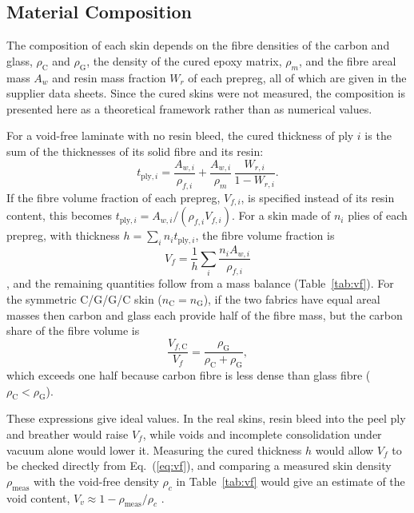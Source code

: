 \documentclass[11pt,a4paper]{article}
\newenvironment{addedblock}{\color{addgreen}}{}
\newenvironment{addedblock}{}{}
\begin{document}
\begin{addedblock}
\subsection{Material Composition}
\label{sec:composition}

The composition of each skin depends on the fibre densities of the
carbon and glass, $\rho_\mathrm{C}$ and $\rho_\mathrm{G}$, the density
of the cured epoxy matrix, $\rho_m$, and the fibre areal mass $A_w$ and
resin mass fraction $W_r$ of each prepreg, all of which are given in
the supplier data sheets. Since the cured skins were not measured, the
composition is presented here as a theoretical framework rather than
as numerical values.

For a void-free laminate with no resin bleed, the cured thickness of
ply $i$ is the sum of the thicknesses of its solid fibre and its resin:
\begin{equation}
    t_{\mathrm{ply},i} = \frac{A_{w,i}}{\rho_{f,i}}
    + \frac{A_{w,i}}{\rho_m}\,\frac{W_{r,i}}{1-W_{r,i}}.
    \label{eq:cpt}
\end{equation}
If the fibre volume fraction of each prepreg, $V_{f,i}$, is specified
instead of its resin content, this becomes
$t_{\mathrm{ply},i} = A_{w,i}/(\rho_{f,i}V_{f,i})$. For a skin made of
$n_i$ plies of each prepreg, with thickness
$h = \sum_i n_i t_{\mathrm{ply},i}$, the fibre volume fraction is
\begin{equation}
    V_f = \frac{1}{h}\sum_i \frac{n_i A_{w,i}}{\rho_{f,i}}
    \label{eq:vf}
\end{equation}
\citep{astm_d3171}, and the remaining quantities follow from a mass
balance (Table~\ref{tab:vf}). For the symmetric C/G/G/C skin
($n_\mathrm{C} = n_\mathrm{G}$), if the two fabrics have equal areal
masses then carbon and glass each provide half of the fibre mass, but
the carbon share of the fibre volume is
\begin{equation}
    \frac{V_{f,\mathrm{C}}}{V_f} = \frac{\rho_\mathrm{G}}{\rho_\mathrm{C}+\rho_\mathrm{G}},
    \label{eq:cshare}
\end{equation}
which exceeds one half because carbon fibre is less dense than glass
fibre ($\rho_\mathrm{C} < \rho_\mathrm{G}$).

These expressions give ideal values. In the real skins, resin bleed
into the peel ply and breather would raise $V_f$, while voids and
incomplete consolidation under vacuum alone would lower it. Measuring
the cured thickness $h$ would allow $V_f$ to be checked directly from
Eq.~(\ref{eq:vf}), and comparing a measured skin density
$\rho_\mathrm{meas}$ with the void-free density $\rho_c$ in
Table~\ref{tab:vf} would give an estimate of the void content,
$V_v \approx 1 - \rho_\mathrm{meas}/\rho_c$ \citep{astm_d3171}.
\end{addedblock}
\end{document}
